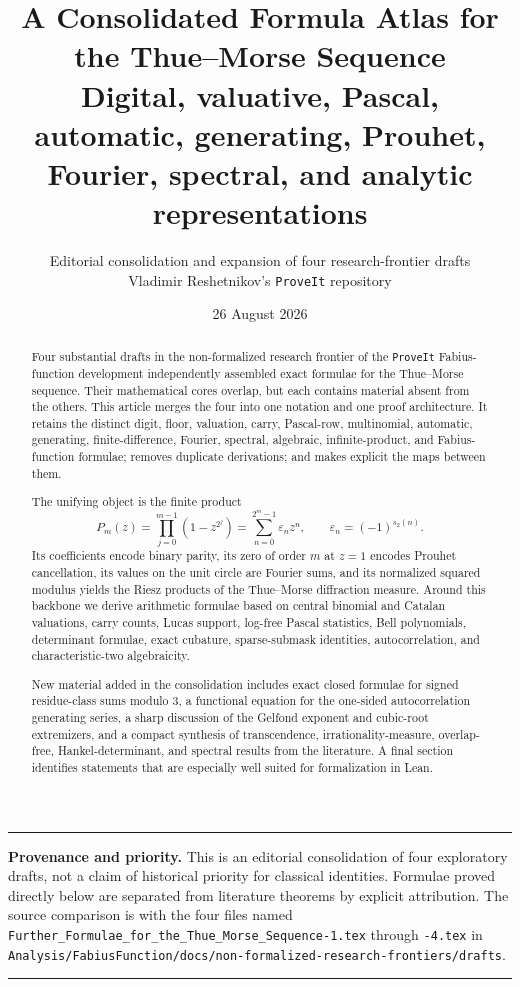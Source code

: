 \documentclass[11pt,oneside]{article}
\title{\bfseries A Consolidated Formula Atlas for the Thue--Morse Sequence\\[0.35em]
\large Digital, valuative, Pascal, automatic, generating, Prouhet, Fourier, spectral, and analytic representations}
\author{Editorial consolidation and expansion of four research-frontier drafts\\
\small Vladimir Reshetnikov's \texttt{ProveIt} repository}
\date{26 August 2026}
\theoremstyle{definition}
\theoremstyle{remark}
\newcommand{\bitsum}{s_2}
\newcommand{\eps}{\varepsilon}
\newenvironment{boxedremark}{%
  \par\smallskip\noindent\begin{center}\begin{minipage}{0.94\textwidth}%
  \color{black}\hrule\vspace{0.6em}\small
}{%
  \vspace{0.6em}\hrule\end{minipage}\end{center}\smallskip
}
\begin{document}
\maketitle

\begin{abstract}
Four substantial drafts in the non-formalized research frontier of the
\texttt{ProveIt} Fabius-function development independently assembled exact
formulae for the Thue--Morse sequence.  Their mathematical cores overlap, but
each contains material absent from the others.  This article merges the four
into one notation and one proof architecture.  It retains the distinct digit,
floor, valuation, carry, Pascal-row, multinomial, automatic, generating,
finite-difference, Fourier, spectral, algebraic, infinite-product, and
Fabius-function formulae; removes duplicate derivations; and makes explicit the
maps between them.

The unifying object is the finite product
\[
  P_m(z)=\prod_{j=0}^{m-1}(1-z^{2^j})
       =\sum_{n=0}^{2^m-1}\eps_n z^n,
  \qquad \eps_n=(-1)^{\bitsum(n)}.
\]
Its coefficients encode binary parity, its zero of order $m$ at $z=1$
encodes Prouhet cancellation, its values on the unit circle are Fourier sums,
and its normalized squared modulus yields the Riesz products of the
Thue--Morse diffraction measure.  Around this backbone we derive arithmetic
formulae based on central binomial and Catalan valuations, carry counts,
Lucas support, log-free Pascal statistics, Bell polynomials, determinant
formulae, exact cubature, sparse-submask identities, autocorrelation, and
characteristic-two algebraicity.

New material added in the consolidation includes exact closed formulae for
signed residue-class sums modulo $3$, a functional equation for the
one-sided autocorrelation generating series, a sharp discussion of the
Gelfond exponent and cubic-root extremizers, and a compact synthesis of
transcendence, irrationality-measure, overlap-free, Hankel-determinant, and
spectral results from the literature.  A final section identifies statements
that are especially well suited for formalization in Lean.
\end{abstract}

\begin{boxedremark}
\textbf{Provenance and priority.}
This is an editorial consolidation of four exploratory drafts, not a claim of
historical priority for classical identities.  Formulae proved directly below
are separated from literature theorems by explicit attribution.  The source
comparison is with the four files named
\texttt{Further\_Formulae\_for\_the\_Thue\_Morse\_Sequence-1.tex} through
\texttt{-4.tex} in
\texttt{Analysis/FabiusFunction/docs/non-formalized-research-frontiers/drafts}.
\end{boxedremark}
\end{document}
